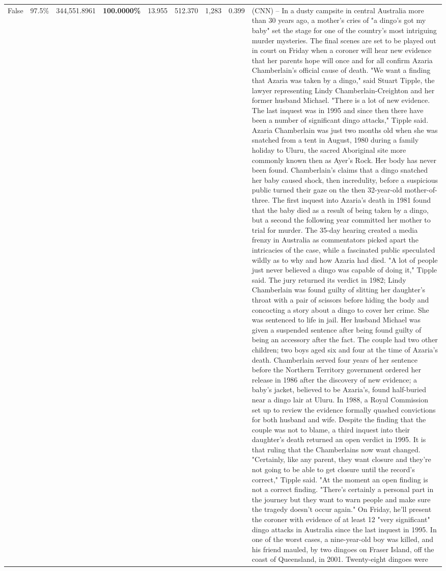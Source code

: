 \begin{table}[H]
\begin{tabular}{lllrlllll}
False & 97.5\% & 344,551.8961 & \bfseries \color{red} 100.0000\% & 13.955 & 512.370 & 1,283 & 0.399 & (CNN) -- In a dusty campsite in central Australia more than 30 years ago, a mother's cries of "a dingo's got my baby" set the stage for one of the country's most intriguing murder mysteries. The final scenes are set to be played out in court on Friday when a coroner will hear new evidence that her parents hope will once and for all confirm Azaria Chamberlain's official cause of death. "We want a finding that Azaria was taken by a dingo," said Stuart Tipple, the lawyer representing Lindy Chamberlain-Creighton and her former husband Michael. "There is a lot of new evidence. The last inquest was in 1995 and since then there have been a number of significant dingo attacks," Tipple said. Azaria Chamberlain was just two months old when she was snatched from a tent in August, 1980 during a family holiday to Uluru, the sacred Aboriginal site more commonly known then as Ayer's Rock. Her body has never been found. Chamberlain's claims that a dingo snatched her baby caused shock, then incredulity, before a suspicious public turned their gaze on the then 32-year-old mother-of-three. The first inquest into Azaria's death in 1981 found that the baby died as a result of being taken by a dingo, but a second the following year committed her mother to trial for murder. The 35-day hearing created a media frenzy in Australia as commentators picked apart the intricacies of the case, while a fascinated public speculated wildly as to why and how Azaria had died. "A lot of people just never believed a dingo was capable of doing it," Tipple said. The jury returned its verdict in 1982; Lindy Chamberlain was found guilty of slitting her daughter's throat with a pair of scissors before hiding the body and concocting a story about a dingo to cover her crime. She was sentenced to life in jail. Her husband Michael was given a suspended sentence after being found guilty of being an accessory after the fact. The couple had two other children; two boys aged six and four at the time of Azaria's death. Chamberlain served four years of her sentence before the Northern Territory government ordered her release in 1986 after the discovery of new evidence; a baby's jacket, believed to be Azaria's, found half-buried near a dingo lair at Uluru. In 1988, a Royal Commission set up to review the evidence formally quashed convictions for both husband and wife. Despite the finding that the couple was not to blame, a third inquest into their daughter's death returned an open verdict in 1995. It is that ruling that the Chamberlains now want changed. "Certainly, like any parent, they want closure and they're not going to be able to get closure until the record's correct," Tipple said. "At the moment an open finding is not a correct finding. "There's certainly a personal part in the journey but they want to warn people and make sure the tragedy doesn't occur again." On Friday, he'll present the coroner with evidence of at least 12 "very significant" dingo attacks in Australia since the last inquest in 1995. In one of the worst cases, a nine-year-old boy was killed, and his friend mauled, by two dingoes on Fraser Island, off the coast of Queensland, in 2001. Twenty-eight dingoes were 
\end{tabular}
\end{table}

